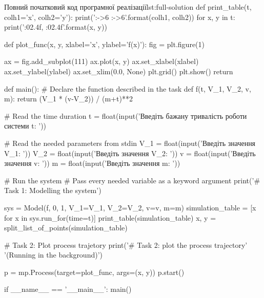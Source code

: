 \documentclass[
	a4paper,
	oneside,
	BCOR = 10mm,
	DIV = 12,
	12pt,
	headings = normal,
]{scrartcl}
\begin{document}
\begin{listingpython}[toprule = 0pt, bottomrule = 0pt]{Повний початковий код програмної реалізації}{lst:full-solution}
def print_table(t, colh1='x', colh2='y'):
    print('{:->6} {:->6}'.format(colh1, colh2))
    for x, y in t:
        print('{:02.4f}, {:02.4f}'.format(x, y))


def plot_func(x, y, xlabel='x', ylabel='f(x)'):
    fig = plt.figure(1)

    ax = fig.add_subplot(111)
    ax.plot(x, y)
    ax.set_xlabel(xlabel)
    ax.set_ylabel(ylabel)
    ax.set_xlim(0.0, None)
    plt.grid()
    plt.show()
    return


def main():
    # Declare the function described in the task
    def f(t, V_1, V_2, v, m): return (V_1 * (v-V_2)) / (m+t)**2

    # Read the time duration
    t = float(input('Введіть бажану тривалість роботи системи t: '))

    # Read the needed parameters from stdin
    V_1 = float(input('Введіть значення V_1: '))
    V_2 = float(input('Введіть значення V_2: '))
    v = float(input('Введіть значення v: '))
    m = float(input('Введіть значення m: '))

    # Run the system
    # Pass every needed variable as a keyword argument
    print('\n# Task 1: Modelling the system')

    sys = Model(f, 0, 1, V_1=V_1, V_2=V_2, v=v, m=m)
    simulation_table = [x for x in sys.run_for(time=t)]
    print_table(simulation_table)
    x, y = split_list_of_points(simulation_table)

    # Task 2: Plot process trajetory
    print('\n# Task 2: plot the process trajectory'
          '\n(Running in the background)')

    p = mp.Process(target=plot_func, args=(x, y))
    p.start()


if __name__ == '__main__':
    main()
			\end{listingpython}
\end{document}
